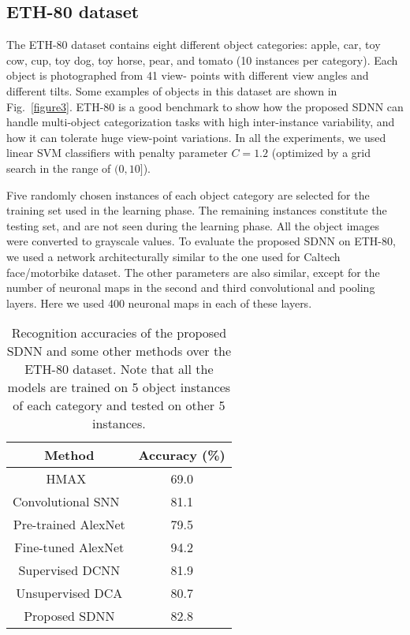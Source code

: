 \documentclass[preprint,5p,12pt,twocolumn]{article}
\begin{document}
\subsection*{ETH-80 dataset}
The ETH-80 dataset contains eight different object categories: apple, car, toy cow, cup, toy dog, toy horse, pear, and tomato (10 instances per category). Each object is photographed from 41 view- points with different view angles and different tilts. Some examples of objects in this dataset are shown in Fig.~\ref{figure3}. ETH-80 is a good benchmark to show how the proposed SDNN can handle multi-object categorization tasks with high inter-instance variability, and how it can tolerate huge view-point variations. In all the experiments, we used linear SVM classifiers with penalty parameter $C=1.2$ (optimized by a grid search in the range of $(0,10]$).



Five randomly chosen instances of each object category are selected for the training set  used in the learning phase. The remaining instances constitute the testing set, and are not seen during the learning phase. All the object images were converted to grayscale values. To evaluate the proposed SDNN on ETH-80, we used a network architecturally similar to the one used for Caltech face/motorbike dataset. The other parameters are also similar, except for the number of neuronal maps in the second and third convolutional and pooling layers. Here we used 400 neuronal maps in each of these layers.%

\begin{table}[!t]
\caption{Recognition accuracies of the proposed SDNN and some other methods over the ETH-80 dataset. Note that all the models are trained on 5 object instances of each category and tested on other 5 instances.}
\label{tab1}
\centering
\begin{tabular}{|c|c|}
\hline
Method & Accuracy (\%)\\ \hline
HMAX~\cite{kheradpisheh2016bio} & 69.0\\ \hline
Convolutional SNN~\cite{kheradpisheh2016bio} & 81.1\\ \hline
Pre-trained AlexNet &  79.5\\ \hline
Fine-tuned AlexNet &  94.2\\ \hline
Supervised DCNN &  81.9\\ \hline
Unsupervised DCA &  80.7\\ \hline
Proposed SDNN & 82.8\\
\hline
\end{tabular}
\end{table}
\end{document}
